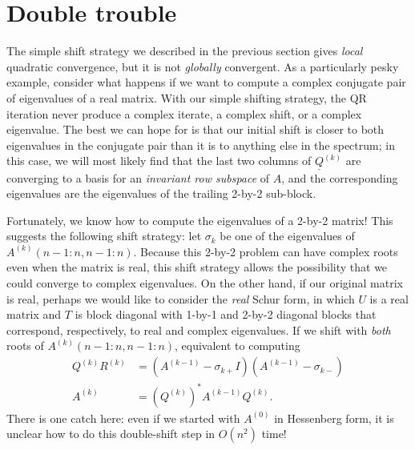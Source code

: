 \documentclass[12pt, leqno]{article} %
\newcommand{\uQ}{\underline{Q}}
\begin{document}

\section{Double trouble}

The simple shift strategy we described in the previous section gives
{\em local} quadratic convergence, but it is not {\em globally} convergent.
%
As a particularly pesky example, consider what happens if we
want to compute a complex conjugate pair of eigenvalues of a real
matrix.  With our simple shifting strategy, 
the QR iteration
never produce a complex iterate, a
complex shift, or a complex eigenvalue.  The best we can hope for is
that our initial shift is closer to both eigenvalues in the conjugate
pair than it is to anything else in the spectrum; in this case, we
will most likely find that the last two columns of $\uQ^{(k)}$ are
converging to a basis for an {\em invariant row subspace} of $A$,
and the corresponding eigenvalues are the eigenvalues of the trailing
2-by-2 sub-block.

Fortunately, we know how to compute the eigenvalues of a 2-by-2
matrix!  This suggests the following shift strategy: let $\sigma_k$ be
one of the eigenvalues of $A^{(k)}(n-1:n,n-1:n)$.  Because this 2-by-2
problem can have complex roots even when the matrix is real, this
shift strategy allows the possibility that we could converge to
complex eigenvalues. On the other hand, if our original matrix is
real, perhaps we would like to consider the {\em real} Schur form, in
which $U$ is a real matrix and $T$ is block diagonal with 1-by-1 and
2-by-2 diagonal blocks that correspond, respectively, to real and
complex eigenvalues.  If we shift with {\em both} roots of
$A^{(k)}(n-1:n,n-1:n)$, equivalent to computing
\begin{align*}
  Q^{(k)} R^{(k)} &= (A^{(k-1)} - \sigma_{k+} I)(A^{(k-1)} - \sigma_{k-}) \\
  A^{(k)} &= (Q^{(k)})^* A^{(k-1)} Q^{(k)}. \label{sqr-2}
\end{align*}
There is one catch here: even if we started with $A^{(0)}$ in Hessenberg
form, it is unclear how to do this double-shift step in $O(n^2)$ time!
\end{document}
